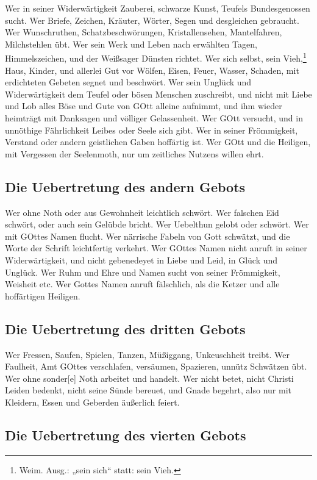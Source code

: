 Wer in seiner Widerwärtigkeit Zauberei, schwarze Kunst, Teufels Bundesgenossen sucht. Wer Briefe, Zeichen, Kräuter, Wörter, Segen und desgleichen gebraucht. Wer Wunschruthen, Schatzbeschwörungen, Kristallensehen, Mantelfahren, Milchstehlen übt. Wer sein Werk und Leben nach erwählten Tagen, Himmelszeichen, und der Weißsager Dünsten richtet. Wer sich selbst, sein Vieh,\footnote{Weim. Ausg.: „sein sich“ statt: sein Vieh.} Haus, Kinder, und allerlei Gut vor Wölfen, Eisen, Feuer, Wasser, Schaden, mit erdichteten Gebeten segnet und beschwört. Wer sein Unglück und Widerwärtigkeit dem Teufel oder bösen Menschen zuschreibt, und nicht mit Liebe und Lob alles Böse und Gute von GOtt alleine aufnimmt, und ihm wieder heimträgt mit Danksagen und völliger Gelassenheit. Wer GOtt versucht, und in unnöthige Fährlichkeit Leibes oder Seele sich gibt. Wer in seiner Frömmigkeit, Verstand oder andern geistlichen Gaben hoffärtig ist. Wer GOtt und die Heiligen, mit Vergessen der Seelenmoth, nur um zeitliches Nutzens willen ehrt.

\subsection{Die Uebertretung des andern Gebots}

Wer ohne Noth oder aus Gewohnheit leichtlich schwört. Wer falschen Eid schwört, oder auch sein Gelübde bricht. Wer Uebelthun gelobt oder schwört. Wer mit GOttes Namen flucht. Wer närrische Fabeln von Gott schwätzt, und die Worte der Schrift leichtfertig verkehrt. Wer GOttes Namen nicht anruft in seiner Widerwärtigkeit, und nicht gebenedeyet in Liebe und Leid, in Glück und Unglück. Wer Ruhm und Ehre und Namen sucht von seiner Frömmigkeit, Weisheit etc. Wer Gottes Namen anruft fälschlich, als die Ketzer und alle hoffärtigen Heiligen.

\subsection{Die Uebertretung des dritten Gebots}

Wer Fressen, Saufen, Spielen, Tanzen, Müßiggang, Unkeuschheit treibt. Wer Faulheit, Amt GOttes verschlafen, versäumen, Spazieren, unnütz Schwätzen übt. Wer ohne sonder[e] Noth arbeitet und handelt. Wer nicht betet, nicht Christi Leiden bedenkt, nicht seine Sünde bereuet, und Gnade begehrt, also nur mit Kleidern, Essen und Geberden äußerlich feiert.

\subsection{Die Uebertretung des vierten Gebots}

